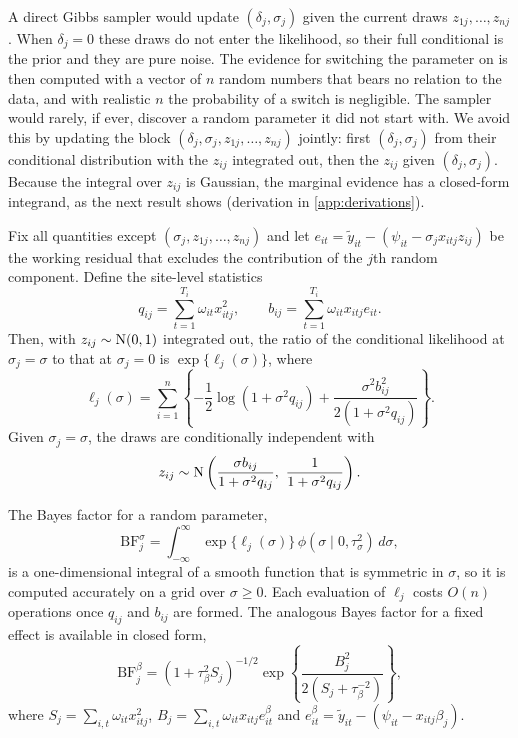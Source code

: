 A direct Gibbs sampler would update $(\delta_j,\sigma_j)$ given the current draws $z_{1j},\dots,z_{nj}$. When $\delta_j=0$ these draws do not enter the likelihood, so their full conditional is the prior and they are pure noise. The evidence for switching the parameter on is then computed with a vector of $n$ random numbers that bears no relation to the data, and with realistic $n$ the probability of a switch is negligible. The sampler would rarely, if ever, discover a random parameter it did not start with. We avoid this by updating the block $(\delta_j,\sigma_j,z_{1j},\dots,z_{nj})$ jointly: first $(\delta_j,\sigma_j)$ from their conditional distribution with the $z_{ij}$ integrated out, then the $z_{ij}$ given $(\delta_j,\sigma_j)$. Because the integral over $z_{ij}$ is Gaussian, the marginal evidence has a closed-form integrand, as the next result shows (derivation in \ref{app:derivations}).

\begin{proposition}\label{prop:marginal}
Fix all quantities except $(\sigma_j,z_{1j},\dots,z_{nj})$ and let $e_{it}=\tilde y_{it}-(\psi_{it}-\sigma_j x_{itj}z_{ij})$ be the working residual that excludes the contribution of the $j$th random component. Define the site-level statistics
\[
q_{ij}=\sum_{t=1}^{T_i}\omega_{it}x_{itj}^2,\qquad b_{ij}=\sum_{t=1}^{T_i}\omega_{it}x_{itj}e_{it}.
\]
Then, with $z_{ij}\sim\mathrm{N}(0,1)$ integrated out, the ratio of the conditional likelihood at $\sigma_j=\sigma$ to that at $\sigma_j=0$ is $\exp\{\ell_j(\sigma)\}$, where
\begin{equation}\label{eq:ell}
\ell_j(\sigma)=\sum_{i=1}^{n}\left\{-\frac12\log\left(1+\sigma^2q_{ij}\right)+\frac{\sigma^2b_{ij}^2}{2\left(1+\sigma^2q_{ij}\right)}\right\}.
\end{equation}
Given $\sigma_j=\sigma$, the draws are conditionally independent with
\[
z_{ij}\sim\Normal\left(\frac{\sigma b_{ij}}{1+\sigma^2q_{ij}},\ \frac{1}{1+\sigma^2q_{ij}}\right).
\]
\end{proposition}

The Bayes factor for a random parameter,
\begin{equation}\label{eq:bf-sigma}
\mathrm{BF}^{\sigma}_j=\int_{-\infty}^{\infty}\exp\{\ell_j(\sigma)\}\,\phi(\sigma\mid0,\tau_\sigma^2)\,d\sigma,
\end{equation}
is a one-dimensional integral of a smooth function that is symmetric in $\sigma$, so it is computed accurately on a grid over $\sigma\ge0$. Each evaluation of $\ell_j$ costs $O(n)$ operations once $q_{ij}$ and $b_{ij}$ are formed. The analogous Bayes factor for a fixed effect is available in closed form,
\begin{equation}\label{eq:bf-beta}
\mathrm{BF}^{\beta}_j=\left(1+\tau_\beta^2S_j\right)^{-1/2}\exp\left\{\frac{B_j^2}{2\left(S_j+\tau_\beta^{-2}\right)}\right\},
\end{equation}
where $S_j=\sum_{i,t}\omega_{it}x_{itj}^2$, $B_j=\sum_{i,t}\omega_{it}x_{itj}e^{\beta}_{it}$ and $e^{\beta}_{it}=\tilde y_{it}-(\psi_{it}-x_{itj}\beta_j)$.

